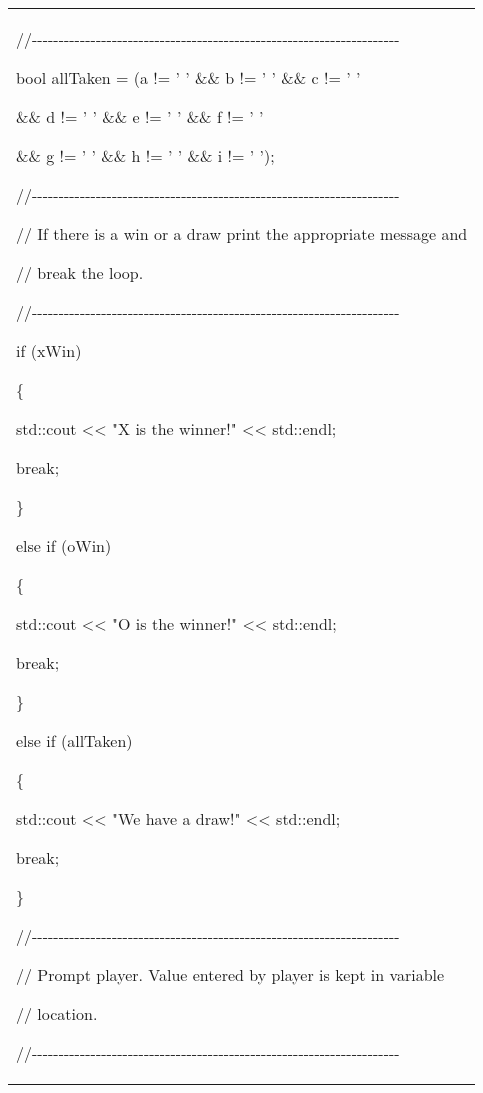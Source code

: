 \documentclass[
]{article}
\begin{document}
\begin{longtable}[]{@{}l@{}}
\begin{minipage}[t]{0.97\columnwidth}
//-\/-\/-\/-\/-\/-\/-\/-\/-\/-\/-\/-\/-\/-\/-\/-\/-\/-\/-\/-\/-\/-\/-\/-\/-\/-\/-\/-\/-\/-\/-\/-\/-\/-\/-\/-\/-\/-\/-\/-\/-\/-\/-\/-\/-\/-\/-\/-\/-\/-\/-\/-\/-\/-\/-\/-\/-\/-\/-\/-\/-\/-\/-\/-\/-\/-\/-\/-\/-

bool allTaken = (a != ' ' \&\& b != ' ' \&\& c != ' '

\&\& d != ' ' \&\& e != ' ' \&\& f != ' '

\&\& g != ' ' \&\& h != ' ' \&\& i != ' ');

//-\/-\/-\/-\/-\/-\/-\/-\/-\/-\/-\/-\/-\/-\/-\/-\/-\/-\/-\/-\/-\/-\/-\/-\/-\/-\/-\/-\/-\/-\/-\/-\/-\/-\/-\/-\/-\/-\/-\/-\/-\/-\/-\/-\/-\/-\/-\/-\/-\/-\/-\/-\/-\/-\/-\/-\/-\/-\/-\/-\/-\/-\/-\/-\/-\/-\/-\/-\/-

// If there is a win or a draw print the appropriate message and

// break the loop.

//-\/-\/-\/-\/-\/-\/-\/-\/-\/-\/-\/-\/-\/-\/-\/-\/-\/-\/-\/-\/-\/-\/-\/-\/-\/-\/-\/-\/-\/-\/-\/-\/-\/-\/-\/-\/-\/-\/-\/-\/-\/-\/-\/-\/-\/-\/-\/-\/-\/-\/-\/-\/-\/-\/-\/-\/-\/-\/-\/-\/-\/-\/-\/-\/-\/-\/-\/-\/-

if (xWin)

\{

std::cout \textless\textless{} "X is the winner!" \textless\textless{}
std::endl;

break;

\}

else if (oWin)

\{

std::cout \textless\textless{} "O is the winner!" \textless\textless{}
std::endl;

break;

\}

else if (allTaken)

\{

std::cout \textless\textless{} "We have a draw!" \textless\textless{}
std::endl;

break;

\}

//-\/-\/-\/-\/-\/-\/-\/-\/-\/-\/-\/-\/-\/-\/-\/-\/-\/-\/-\/-\/-\/-\/-\/-\/-\/-\/-\/-\/-\/-\/-\/-\/-\/-\/-\/-\/-\/-\/-\/-\/-\/-\/-\/-\/-\/-\/-\/-\/-\/-\/-\/-\/-\/-\/-\/-\/-\/-\/-\/-\/-\/-\/-\/-\/-\/-\/-\/-\/-

// Prompt player. Value entered by player is kept in variable

// location.

//-\/-\/-\/-\/-\/-\/-\/-\/-\/-\/-\/-\/-\/-\/-\/-\/-\/-\/-\/-\/-\/-\/-\/-\/-\/-\/-\/-\/-\/-\/-\/-\/-\/-\/-\/-\/-\/-\/-\/-\/-\/-\/-\/-\/-\/-\/-\/-\/-\/-\/-\/-\/-\/-\/-\/-\/-\/-\/-\/-\/-\/-\/-\/-\/-\/-\/-\/-\/-


\end{minipage}
\end{longtable}
\end{document}
